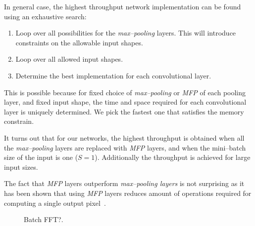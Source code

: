 \documentclass[conference]{IEEEtran}
\begin{document}
  In general case, the highest throughput network implementation can
  be found using an exhaustive search:

  \begin{enumerate}
    \item Loop over all possibilities for the \emph{max--pooling}
      layers.  This will introduce constraints on the allowable input
      shapes.
    \item Loop over all allowed input shapes.
    \item Determine the best implementation for each convolutional
      layer.
  \end{enumerate}

  This is possible because for fixed choice of \emph{max--pooling} or
  \emph{MFP} of each pooling layer, and fixed input shape, the time
  and space required for each convolutional layer is uniquely
  determined.  We pick the fastest one that satisfies the memory
  constrain.

  It turns out that for our networks, the highest throughput is
  obtained when all the \emph{max--pooling} layers are replaced with
  \emph{MFP} layers, and when the mini--batch size of the input is one
  ($S = 1$).  Additionally the throughput is achieved for large input
  sizes.

  The fact that \emph{MFP} layers outperform \emph{max--pooling
    layers} is not surprising as it has been shown that using
  \emph{MFP} layers reduces amount of operations required for
  computing a single output pixel~\cite{giusti2013fast,masci2013fast}.


  \begin{figure}
    \centering
    \caption{Batch FFT?.}
    \label{fig:fftbatch}
  \end{figure}
\end{document}
